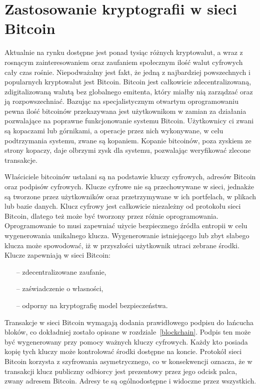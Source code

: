 \documentclass[12pt, twoside, final, openany]{mgr}
\begin{document}
\section{Zastosowanie kryptografii w sieci Bitcoin} \label{sec:zastosowanieKryptografii}
\indent Aktualnie na rynku dostępne jest ponad tysiąc różnych kryptowalut, a wraz z rosnącym zainteresowaniem oraz zaufaniem społecznym ilość walut cyfrowych cały czas rośnie\cite{Zcoinmarketcap, TheAgeOfCryptocurrency}. Niepodważalny jest fakt, że jedną z najbardziej powszechnych i popularnych kryptowalut jest Bitcoin. Bitcoin jest całkowicie zdecentralizowaną, zdigitalizowaną walutą bez globalnego emitenta, który miałby nią zarządzać oraz ją rozpowszechniać. Bazując na specjalistycznym otwartym oprogramowaniu pewna ilość bitcoinów przekazywana jest użytkownikom w zamian za działania pozwalające na poprawne funkcjonowanie systemu Bitcoin. Użytkownicy ci zwani są kopaczami lub górnikami, a operacje przez nich wykonywane, w celu podtrzymania systemu, zwane są kopaniem. Kopanie bitcoinów, poza zyskiem ze strony kopaczy, daje olbrzymi zysk dla systemu, pozwalając weryfikować zlecone transakcje.

\indent Właściciele bitcoinów ustalani są na podstawie kluczy cyfrowych, adresów Bitcoin oraz podpisów cyfrowych. Klucze cyfrowe nie są przechowywane w sieci, jednakże są tworzone przez użytkowników oraz przetrzymywane w ich portfelach, w plikach lub bazie danych. Klucz cyfrowy jest całkowicie niezależny od protokołu sieci Bitcoin, dlatego też może być tworzony przez różnie oprogramowania. Oprogramowanie to musi zapewniać użycie bezpiecznego źródła entropii w celu wygenerowania unikalnego klucza\cite{Mastering, asychPrivateKey}. Wygenerowanie istniejącego lub zbyt słabego klucza może spowodować, iż w przyszłości użytkownik utraci zebrane środki. Klucze zapewniają w sieci Bitcoin:
\begin{itemize}
\item[--] zdecentralizowane zaufanie,
\item[--] zaświadczenie o własności,
\item[--] odporny na kryptografię model bezpieczeństwa.
\end{itemize}
Transakcje w sieci Bitcoin wymagają dodania prawidłowego podpisu do łańcucha bloków, co dokładniej zostało opisane w rozdziale~\ref{blockchain}. Podpis ten może być wygenerowany przy pomocy ważnych kluczy cyfrowych. Każdy kto posiada kopię tych kluczy może kontrolować środki dostępne na koncie. Protokół sieci Bitcoin korzysta z szyfrowania asymetrycznego, co w konsekwencji oznacza, że w transakcji klucz publiczny odbiorcy jest prezentowy przez jego odcisk palca, zwany adresem Bitcoin. Adresy te są ogólnodostępne i widoczne przez wszystkich\cite{blockchaininfo}. 
\end{document}
